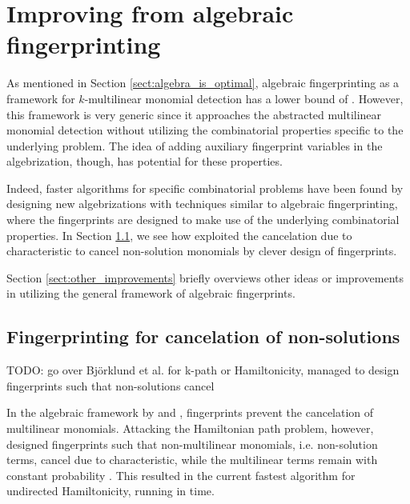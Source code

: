 \clearpage
\section{Improving from algebraic fingerprinting}
\label{sect:improvements}

As mentioned in Section \ref{sect:algebra_is_optimal}, 
algebraic fingerprinting as a framework %
for $k$-multilinear monomial detection has a lower bound of . 
However, this framework is very generic since it 
approaches the abstracted multilinear monomial detection without 
utilizing the combinatorial properties specific to the underlying problem. 
The idea of adding auxiliary fingerprint variables in the algebrization, though, 
has potential for these properties.

Indeed, faster algorithms for specific combinatorial problems 
have been found by designing new algebrizations with techniques 
similar to algebraic fingerprinting, where the fingerprints are designed to make use of 
the underlying combinatorial properties. In Section \ref{sect:cancel_nonsolutions}, 
we see how \citeauthor{Björklund14} \cite{Björklund14} 
exploited the cancelation due to characteristic to cancel non-solution monomials 
by clever design of fingerprints. 

Section \ref{sect:other_improvements} briefly overviews other ideas or 
improvements in utilizing the general framework of algebraic fingerprints.

\subsection{Fingerprinting for cancelation of non-solutions}
\label{sect:cancel_nonsolutions}

TODO: go over Björklund et al. for k-path or Hamiltonicity, managed to design fingerprints such that non-solutions cancel

In the algebraic framework by \citeauthor{Koutis08} and \citeauthor{Williams09}, 
fingerprints prevent the cancelation of multilinear monomials. 
Attacking the Hamiltonian path problem, however, \citeauthor{Björklund14} 
designed fingerprints such that non-multilinear monomials, i.e. non-solution terms, 
cancel due to characteristic, while the multilinear terms 
remain with constant probability \cite{Björklund14}. This resulted in the current 
fastest algorithm for undirected Hamiltonicity, running in  time.

